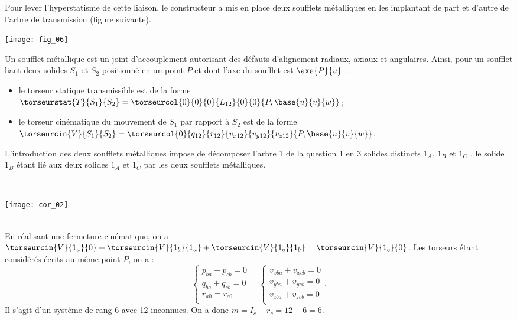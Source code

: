 \ifprof
\else
Pour lever l’hyperstatisme de cette liaison, le constructeur a mis en place deux soufflets métalliques en les implantant de part et d’autre de l’arbre de transmission (figure suivante).

\begin{marginfigure}
\texttt{[image: fig\_06]}
\end{marginfigure}

Un soufflet métallique est un joint d’accouplement autorisant des défauts d’alignement radiaux, axiaux et angulaires. Ainsi, pour un soufflet liant deux solides $S_1$ et $S_2$ positionné en un point $P$ et dont l’axe du soufflet est $\axe{P}{u}$ :
\begin{itemize}
\item le torseur statique transmissible est de la forme $\torseurstat{T}{S_1}{S_2}=\torseurcol{0}{0}{0}{L_{12}}{0}{0}{P,\base{u}{v}{w}}$;
\item le torseur cinématique du mouvement de $S_1$ par rapport à $S_2$ est de la forme $\torseurcin{V}{S_1}{S_2}=\torseurcol{0}{q_{12}}{r_{12}}{v_{x12}}{v_{y12}}{v_{z12}}{P,\base{u}{v}{w}}$.
\end{itemize}


L’introduction des deux soufflets métalliques impose de décomposer l’arbre 1 de la question 1 en 3 solides distincts $1_A$, $1_B$ et $1_C$ , le solide $1_B$ étant lié aux deux solides $1_A$ et $1_C$ par les deux soufflets métalliques.

\fi


\ifprof
\begin{corrige} ~\\

\begin{center}
\texttt{[image: cor\_02]}
\end{center}

\end{corrige}
\else
\fi


\ifprof
\begin{corrige} ~\\
En réalisant une fermeture cinématique, on a $\torseurcin{V}{1_a}{0}+\torseurcin{V}{1_b}{1_a}+\torseurcin{V}{1_c}{1_b}=\torseurcin{V}{1_c}{0}$. 
Les torseurs étant considérés écrits au même point $P$, on a : 
$$
\left\{ 
\begin{array}{l}
p_{ba}+p_{cb}=0 \\
q_{ba}+q_{cb}=0 \\
r_{a0}=r_{c0}\\
\end{array}
\right. 
\quad
\left\{ 
\begin{array}{l}
v_{xba} + v_{xcb}=0\\
v_{yba} + v_{ycb}=0\\
v_{zba} + v_{zcb}=0\\
\end{array}
\right. .
$$
Il s'agit d'un système de rang 6 avec 12 inconnues. On a donc $m=I_c-r_c=12-6=6$.
\end{corrige}
\else
\fi


